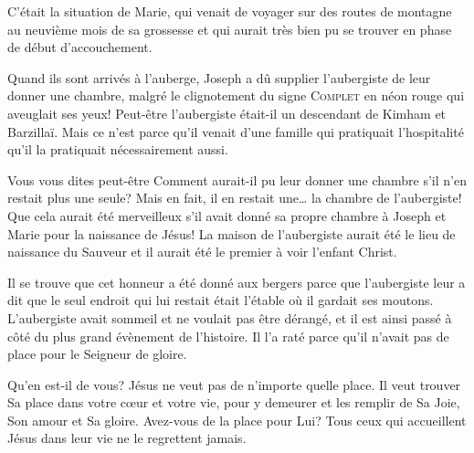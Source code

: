 C'était la situation de Marie, qui venait de voyager sur des routes de montagne au neuvième mois de sa grossesse et qui aurait très bien pu se trouver en phase de début d'accouchement.

Quand ils sont arrivés à l'auberge, Joseph a dû supplier l'aubergiste de leur donner une chambre, malgré le clignotement du signe \textsc{Complet} en néon rouge qui aveuglait ses yeux! Peut-être l'aubergiste était-il un descendant de Kimham et Barzillaï. Mais ce n'est parce qu'il venait d'une famille qui pratiquait l'hospitalité qu'il la pratiquait nécessairement aussi.

Vous vous dites peut-être\frcolon{} \Og Comment aurait-il pu leur donner une chambre s'il n'en restait plus une seule? \Fg{} Mais en fait, il en restait une… la chambre de l'aubergiste! Que cela aurait été merveilleux s'il avait donné sa propre chambre à Joseph et Marie pour la naissance de Jésus! La maison de l'aubergiste aurait été le lieu de naissance du Sauveur et il aurait été le premier à voir l'enfant Christ.

Il se trouve que cet honneur a été donné aux bergers parce que l'aubergiste leur a dit que le seul endroit qui lui restait était l'étable où il gardait ses moutons. L'aubergiste avait sommeil et ne voulait pas être dérangé, et il est ainsi passé à côté du plus grand évènement de l'histoire. Il l'a raté parce qu'il n'avait pas de place pour le Seigneur de gloire.

Qu'en est-il de vous? Jésus ne veut pas de n'importe quelle place. Il veut trouver Sa place dans votre cœur et votre vie, pour y demeurer et les remplir de Sa Joie, Son amour et Sa gloire. Avez-vous de la place pour Lui? Tous ceux qui accueillent Jésus dans leur vie ne le regrettent jamais.


\begin{dvquotes}


\end{dvquotes}
